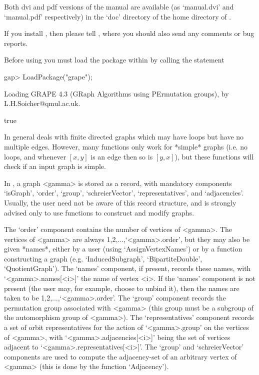 Both dvi and pdf versions of the {\GRAPE} manual are available
(as `manual.dvi' and `manual.pdf' respectively) in the `doc' directory
of the home directory of {\GRAPE}.

If you install {\GRAPE}, then please tell ,
where you should also send any comments or bug reports.


Before using {\GRAPE} you must load the package within {\GAP} by calling 
the statement

\begintt
gap> LoadPackage("grape");

Loading  GRAPE 4.3  (GRaph Algorithms using PErmutation groups),
by L.H.Soicher@qmul.ac.uk.

true
\endtt

 
In general {\GRAPE} deals with finite directed graphs which may have
loops but have no multiple edges. However, many {\GRAPE} functions only
work for *simple* graphs (i.e. no loops, and whenever $[x,y]$ is an
edge then so is $[y,x]$), but these functions will check if an input
graph is simple.

In {\GRAPE}, a graph <gamma> is stored as a record, with mandatory
components `isGraph', `order', `group', `schreierVector',
`representatives', and `adjacencies'. Usually, the user need not be
aware of this record structure, and is strongly advised only to use
{\GRAPE} functions to construct and modify graphs.

The `order' component contains the number of vertices of <gamma>. The
vertices of <gamma> are always 1,2,...,`<gamma>.order', but they may also
be given *names*, either by a user (using `AssignVertexNames') or by a
function constructing a graph (e.g. `InducedSubgraph', `BipartiteDouble',
`QuotientGraph'). The `names' component, if present, records these
names, with `<gamma>.names[<i>]' the name of vertex <i>.  If the `names'
component is not present (the user may, for example, choose to unbind
it), then the names are taken to be 1,2,...,`<gamma>.order'. The `group'
component records the {\GAP} permutation group associated with <gamma>
(this group must be a subgroup of the automorphism group of <gamma>). The
`representatives' component records a set of orbit representatives
for the action of `<gamma>.group' on the vertices of <gamma>, with
`<gamma>.adjacencies[<i>]' being the set of vertices adjacent to
`<gamma>.representatives[<i>]'. The `group' and `schreierVector'
components are used to compute the adjacency-set of an arbitrary vertex
of <gamma> (this is done by the function `Adjacency').

